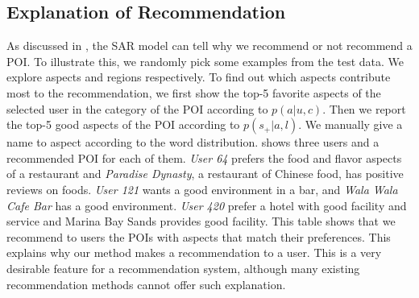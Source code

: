 \subsection{Explanation of Recommendation}
\label{sec:reason}
As discussed in , the SAR model can tell why we recommend
or not recommend a POI. To illustrate this, we randomly pick
some examples from the test data. We explore aspects and regions respectively. To find
out which aspects contribute most to the recommendation, we first show the top-5 favorite
aspects of the selected user in the category of the POI according to $p(a|u,c)$.
Then we report the top-5 good
aspects of the POI according to $p(s_+|a,l)$.
We manually give a name to aspect according to the word distribution.
 shows three users and a recommended POI for each of them.
\emph{User 64} prefers the food and flavor aspects of a restaurant and
\emph{Paradise Dynasty}, a restaurant of Chinese food, has positive reviews
on foods. \emph{User 121} wants a good environment in a bar, and
\emph{Wala Wala Cafe Bar} has a good environment. \emph{User 420}
prefer a hotel with good facility and service and Marina Bay Sands
provides good facility.
This table shows that we recommend to users the POIs with aspects
that match their preferences. This explains why our method makes
a recommendation to a user. This is a very desirable feature for
a recommendation system, although many existing
recommendation methods cannot offer such explanation.


